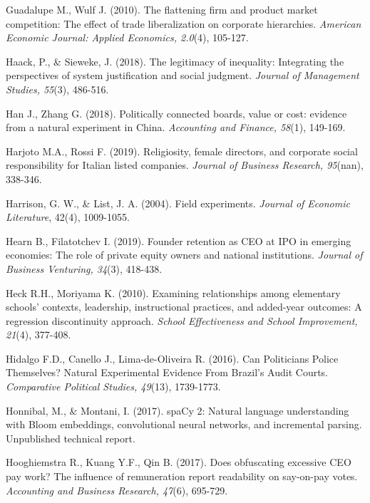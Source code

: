 \documentclass[english]{article}
\begin{document}
\begin{singlespace}
\begin{list}{}{\setlength\itemindent{-\leftmargin}}
\item *Guadalupe M., Wulf J. (2010). The flattening firm and product market competition: The effect of trade liberalization on corporate hierarchies. \emph{American Economic Journal: Applied Economics, 2.0}(4), 105-127.

\item Haack, P., \& Sieweke, J. (2018). The legitimacy of inequality: Integrating the perspectives of system justification and social judgment. \emph{Journal of Management Studies, 55}(3), 486-516.

\item *Han J., Zhang G. (2018). Politically connected boards, value or cost: evidence from a natural experiment in China. \emph{Accounting and Finance, 58}(1), 149-169.

\item *Harjoto M.A., Rossi F. (2019). Religiosity, female directors, and corporate social responsibility for Italian listed companies.  \emph{Journal of Business Research, 95}(nan), 338-346.

\item Harrison, G. W., \& List, J. A. (2004). Field experiments. \emph{Journal of Economic Literature}, 42(4), 1009-1055.

\item *Hearn B., Filatotchev I. (2019). Founder retention as CEO at IPO in emerging economies: The role of private equity owners and national institutions. \emph{Journal of Business Venturing, 34}(3), 418-438.

\item *Heck R.H., Moriyama K. (2010). Examining relationships among elementary schools' contexts, leadership, instructional practices, and added-year outcomes: A regression discontinuity approach. \emph{School Effectiveness and School Improvement, 21}(4), 377-408.

\item *Hidalgo F.D., Canello J., Lima-de-Oliveira R. (2016). Can Politicians Police Themselves? Natural Experimental Evidence From Brazil's Audit Courts. \emph{Comparative Political Studies, 49}(13), 1739-1773.

\item Honnibal, M., \& Montani, I. (2017). spaCy 2: Natural language
    understanding with Bloom embeddings, convolutional neural networks, and
    incremental parsing. Unpublished technical report. 

\item *Hooghiemstra R., Kuang Y.F., Qin B. (2017). Does obfuscating excessive CEO pay work? The influence of remuneration report readability on say-on-pay votes. \emph{Accounting and Business Research, 47}(6), 695-729.


\end{list}
\end{singlespace}
\end{document}
